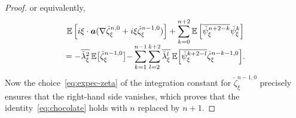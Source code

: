 \documentclass[10pt,a4paper]{article}
\theoremstyle{plain}
\theoremstyle{definition}
\numberwithin{equation}{section}
\newcommand{\Aa}{\boldsymbol a}
\newcommand{\expec}[1]{\mathbb{E}\left[ #1 \right]}
\newcommand{\Bexpec}[1]{\mathbb{E}\Bigl[ #1 \Bigr]}
\newcommand{\expecm}[1]{\mathbb{E}\bigl[ #1 \bigr]}\let\bexpec\expecm
\begin{document}
\begin{proof}
or equivalently,\vspace*{-3pt}
\begin{multline*}
\expec{i\xi \cdot \Aa(\nabla \check\zeta_\xi^{n,0}+i\xi\check\zeta_\xi^{n-1,0})}+\sum_{k=0}^{n+2}\expec{\overline{\check \psi_\xi^{n+2-k}}\check\psi_\xi^{k}}\\[-5pt]
={-}\overline{\check \lambda_\xi^2}\,\expecm{\check\zeta_\xi^{n-1,0}}
{-}\sum_{k=1}^{n-1}\sum_{l=2}^{k+2}\overline{\check \lambda_\xi^l}\,\Bexpec{ \overline{\check \psi_\xi^{k+2-l}}\check\zeta_\xi^{n-k-1,0}}.
\end{multline*}
Now the choice~\eqref{eq:expec-zeta} of the integration constant for $\check\zeta_\xi^{n-1,0}$ precisely ensures that the right-hand side vanishes, which proves that the identity~\eqref{eq:chocolate} holds with $n$ replaced by $n+1$.
\end{proof}
\end{document}

